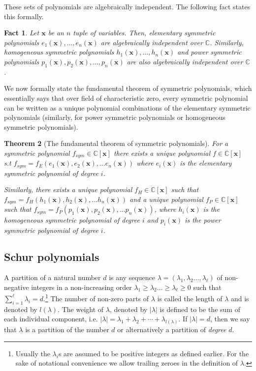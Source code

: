 \documentclass[10pt,a4paper]{article}
\newtheorem{theorem}{Theorem}
\newtheorem{fact}[theorem]{Fact}
\theoremstyle{definition}
\newcommand{\F}{\mathbb C}
\newcommand{\vx}{\mathbf x}
\newcommand{\abs}[1]{\left|#1\right|}
\begin{document}
These sets of polynomials are algebraically independent. The following fact states this formally. 
\begin{fact}\label{fact:sym ad}
Let $\vx$ be an $n$ tuple of variables. Then, elementary symmetric polynomials $e_1(\vx), \ldots, e_n(\vx)$   are algebraically independent over $\F$. Similarly,  homogeneous symmetric polynomials $h_1(\vx), \ldots, h_n(\vx)$ and power symmetric polynomials $p_1(\vx), p_2(\vx), \ldots, p_n(\vx)$ are also algebraically independent over $\F$. 
\end{fact}

%

We now formally state the fundamental theorem of symmetric polynomials, which essentially says that over field of characteristic zero, every symmetric polynomial can be written as a unique polynomial combinations of the elementary symmetric polynomials (similarly, for power symmetric polynomials or homogeneous symmetric polynomials).
\begin{theorem}[The fundamental theorem of symmetric polynomials]
\label{thm:fundamental}
For a symmetric polynomial $f_{sym} \in \F[\vx]$ there exists a unique polynomial $f \in \F[\vx]$ s.t $f_{sym}=f_E(e_1(\vx),e_2(\vx), \ldots e_n(\vx))$ where $e_i(\vx)$ is the elementary symmetric polynomial of degree $i$. 
 
Similarly, there exists a unique polynomial $f_H \in \F[\vx]$ such that $f_{sym} =f_H(h_1(\vx),h_2(\vx), \ldots h_n(\vx))$ and a unique polynomial $f_P \in \F[\vx]$ such that $f_{sym} =f_P(p_1(\vx),p_2(\vx), \ldots p_n(\vx))$, where $h_i(\vx)$ is the homogeneous symmetric polynomial of degree $i$ and $p_i(\vx)$ is the power symmetric polynomial of degree $i$. 
\end{theorem} 

\subsection{Schur polynomials}
\label{sec:prelim-schur}
A partition of a natural number $d$ is any sequence $\lambda = (\lambda_1,\lambda_2 \ldots, \lambda_{\ell} )$ of non-negative integers in a non-increasing order $\lambda_1 \geq \lambda_2 \ldots \geq  \lambda_{\ell} \geq 0$ such that $\sum_{i = 1}^{\ell} \lambda_i = d$.\footnote{Usually the $\lambda_i$s are assumed to be positive integers as defined earlier. For the sake of notational convenience we allow trailing zeroes in the definition of $\lambda$.}
The number of non-zero parts of $\lambda$ is called the length of $\lambda$ and is denoted by $l(\lambda)$. The weight of $\lambda$, denoted by $\abs{\lambda}$ is defined to be the sum of each individual component, i.e. $|\lambda|=\lambda_1 +
\lambda_2+ \cdots + \lambda_{l(\lambda)}$. If $|\lambda|=d$, then we say that $\lambda$ is a partition of the number $d$ or alternatively a partition of \emph{degree} $d$.  
\end{document}

